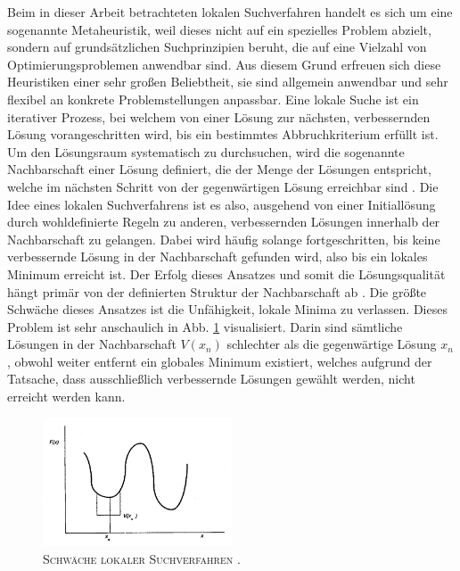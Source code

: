 Beim in dieser Arbeit betrachteten lokalen Suchverfahren handelt es sich um eine sogenannte Metaheuristik,
weil dieses nicht auf ein spezielles Problem abzielt, sondern auf grundsätzlichen Suchprinzipien beruht,
die auf eine Vielzahl von Optimierungsproblemen anwendbar sind. Aus diesem Grund erfreuen sich diese Heuristiken einer sehr großen Beliebtheit, sie sind allgemein anwendbar und sehr flexibel an konkrete Problemstellungen anpassbar.
Eine lokale Suche ist ein iterativer Prozess, bei welchem von einer Lösung zur nächsten, verbessernden Lösung vorangeschritten wird, bis ein bestimmtes Abbruchkriterium erfüllt ist. Um den Lösungsraum systematisch zu durchsuchen, wird die
sogenannte Nachbarschaft einer Lösung definiert, die der Menge der Lösungen entspricht, welche im nächsten Schritt
von der gegenwärtigen Lösung erreichbar sind \cite{Brucker2006}.
Die Idee eines lokalen Suchverfahrens ist es also, ausgehend von einer Initiallösung durch wohldefinierte Regeln zu anderen,
verbessernden Lösungen innerhalb der Nachbarschaft zu gelangen. Dabei wird häufig solange fortgeschritten, bis keine verbessernde Lösung in der Nachbarschaft gefunden wird, also bis ein lokales Minimum erreicht ist.
Der Erfolg dieses Ansatzes und somit die Lösungsqualität hängt primär von der definierten Struktur
der Nachbarschaft ab \cite{Pirlot1996}.
Die größte Schwäche dieses Ansatzes ist die Unfähigkeit, lokale Minima zu verlassen. Dieses Problem ist sehr
anschaulich in Abb. \ref{fig:local_search_weakness} visualisiert. Darin sind sämtliche Lösungen in der
Nachbarschaft $V(x_n)$ schlechter als die gegenwärtige Lösung $x_n$, obwohl weiter entfernt ein globales Minimum
existiert, welches aufgrund der Tatsache, dass ausschließlich verbessernde Lösungen gewählt werden,
nicht erreicht werden kann.

\vfill
\pagebreak

\begin{figure}[H]
\centering
\includegraphics[width=0.5\textwidth]{img/local_minimum.png}
\caption{\textsc{Schwäche lokaler Suchverfahren \cite{Pirlot1996}.}}
\label{fig:local_search_weakness}
\end{figure}

